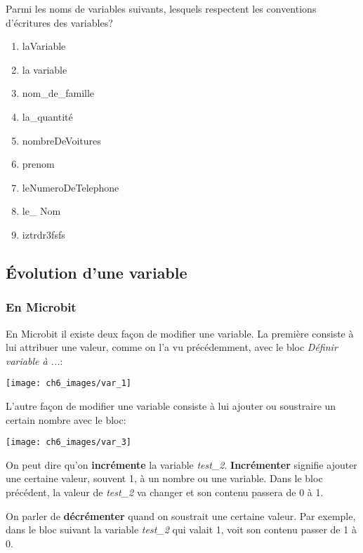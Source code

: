 \documentclass[11pt, a4paper]{book}
\begin{document}
\begin{exercice}
Parmi les noms de variables suivants, lesquels respectent les conventions d'écritures des variables?
\begin{enumerate}
\item laVariable
\item la variable
\item nom\_de\_famille
\item la\_quantité
\item nombreDeVoitures
\item prenom
\item leNumeroDeTelephone
\item le\_ Nom
\item iztrdr3fsfs

\end{enumerate}
\end{exercice}


\subsection{\'Evolution d'une variable}

\subsubsection{En Microbit}

En Microbit il existe deux façon de modifier une variable. La première consiste à lui attribuer une valeur, comme on l'a vu précédemment, avec le bloc {\it Définir variable à ...}:

\begin{center}
\texttt{[image: ch6\_images/var\_1]}
\end{center}

L'autre façon de modifier une variable consiste à lui ajouter ou soustraire un certain nombre avec le bloc:

\begin{center}
\texttt{[image: ch6\_images/var\_3]}
\end{center}

On peut dire qu'on {\bf incrémente} la variable {\it test\_2}. {\bf Incrémenter} signifie ajouter une certaine valeur, souvent 1, à un nombre ou une variable. Dans le bloc précédent, la valeur de {\it test\_2} va changer et son contenu passera de 0 à 1. 

On parler de {\bf décrémenter} quand on soustrait une certaine valeur. Par exemple, dans le bloc suivant la variable {\it test\_2} qui valait 1, voit son contenu passer de 1 à 0.
\end{document}
